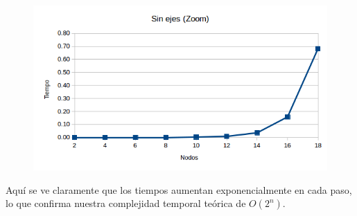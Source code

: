 \begin{figure}[h!]
   \begin{center}
 	\includegraphics[scale=0.7]{imagenes/exacto/Vacio(zoom).png}
   \end{center}
 \end{figure}

Aqu\'i se ve claramente que los tiempos aumentan exponencialmente en cada paso, lo que confirma nuestra complejidad temporal te\'orica de $O(2^n)$.\\
